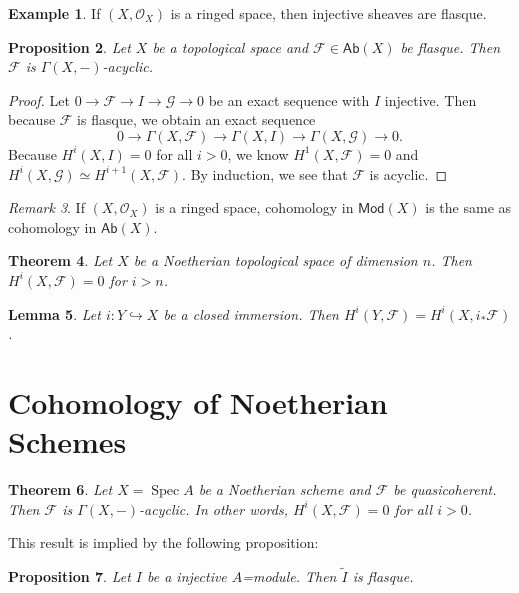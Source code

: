 \documentclass[leqno, openany]{memoir}
\newtheorem{thm}{Theorem}[section]
\newtheorem{prop}[thm]{Proposition}
\newtheorem{lem}[thm]{Lemma}
\theoremstyle{definition}
\newtheorem{exm}[thm]{Example}
\theoremstyle{remark}
\newtheorem{rmk}[thm]{Remark}
\theoremstyle{plain}
\theoremstyle{definition}
\theoremstyle{remark}
\newcommand{\mc}[1]{\mathcal{#1}}
\newcommand{\ms}[1]{\mathsf{#1}}
\newcommand{\wt}[1]{\widetilde{#1}}
\DeclareMathOperator{\Spec}{Spec}
\begin{document}
\begin{exm}
    If $(X, \mc{O}_X)$ is a ringed space, then injective sheaves are flasque.
\end{exm}

\begin{prop}
    Let $X$ be a topological space and $\mc{F} \in \ms{Ab}(X)$ be flasque. Then $\mc{F}$ is $\Gamma(X,-)$-acyclic.
\end{prop}

\begin{proof}
    Let $0 \to \mc{F} \to I \to \mc{G} \to 0$ be an exact sequence with $I$ injective. Then because $\mc{F}$ is flasque, we obtain an exact sequence
    \[ 0 \to \Gamma(X, \mc{F}) \to \Gamma(X, I) \to \Gamma(X, \mc{G}) \to 0. \]
    Because $H^i(X, I) = 0$ for all $i > 0$, we know $H^1(X, \mc{F}) = 0$ and $H^i(X, \mc{G}) \simeq H^{i+1}(X, \mc{F})$. By induction, we see that $\mc{F}$ is acyclic. 
\end{proof}

\begin{rmk}
    If $(X, \mc{O}_X)$ is a ringed space, cohomology in $\ms{Mod}(X)$ is the same as cohomology in $\ms{Ab}(X)$.
\end{rmk}

\begin{thm}
    Let $X$ be a Noetherian topological space of dimension $n$. Then $H^i(X, \mc{F}) = 0$ for $i > n$.
\end{thm}

\begin{lem}
    Let $i \colon Y \hookrightarrow X$ be a closed immersion. Then $H^i(Y, \mc{F}) = H^i(X, i_* \mc{F})$.
\end{lem}

\section{Cohomology of Noetherian Schemes}%
\label{sec:cohomology_of_noetherian_schemes}

\begin{thm}
    Let $X = \Spec A$ be a Noetherian scheme and $\mc{F}$ be quasicoherent. Then $\mc{F}$ is $\Gamma(X,-)$-acyclic. In other words, $H^i(X, \mc{F}) = 0$ for all $i > 0$.
\end{thm}

This result is implied by the following proposition:
\begin{prop}
    Let $I$ be a injective $A$=module. Then $\wt{I}$ is flasque.
\end{prop}
\end{document}
